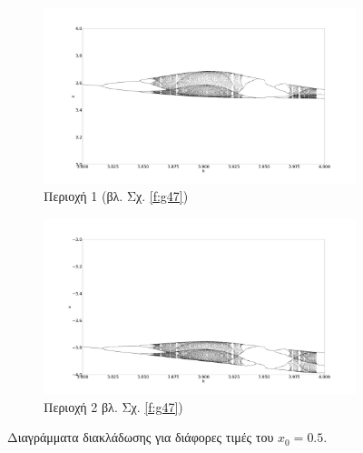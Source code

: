 \begin{figure}[ht]
	\centering	
	\begin{subfigure}[b]{0.8\textwidth}
		\centering
		\includegraphics[width=\textwidth]{LateX images/sine q=-0.5/g7}
		\caption{Περιοχή 1 (βλ. Σχ. \ref{f:g47})}
		\label{f:g522}
	\end{subfigure}
	\hfill
	\begin{subfigure}[b]{0.8\textwidth}
		\centering
		\includegraphics[width=\textwidth]{LateX images/sine q=-0.5/g7.2}
		\caption{Περιοχή 2 βλ. Σχ. \ref{f:g47})}
		\label{f:g523}
	\end{subfigure}
	\caption{Διαγράμματα διακλάδωσης για διάφορες τιμές του $x_0=0.5$. }
	\label{f:g238}
\end{figure}
